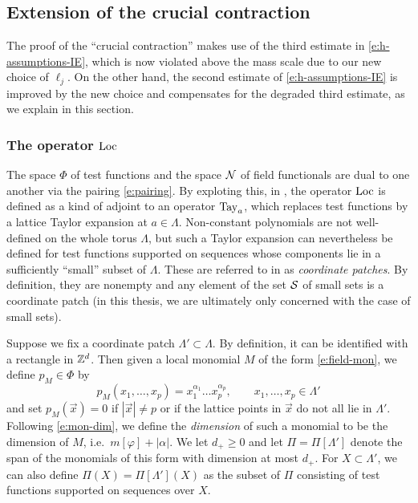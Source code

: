 
\subsection{Extension of the crucial contraction}
\label{sec:cc}

The proof of the ``crucial contraction''
\cite[Proposition \ref{IE-prop:cl}]{BS-rg-IE}
makes use of the  third estimate in
\eqref{e:h-assumptions-IE}, which is now violated above the mass scale
due to our new choice of $\ell_j$.
On the other hand, the second estimate of \eqref{e:h-assumptions-IE} is
improved by the new choice and compensates for the degraded third estimate,
as we explain in this section.

\subsubsection{The operator $\operatorname{Loc}$}

The space $\Phi$ of test functions and the space $\mathcal{N}$ of field functionals
are dual to one another via the pairing \eqref{e:pairing}. By exploting this,
in \cite{BS-rg-IE}, the operator $\operatorname{Loc}$ is defined as a kind of adjoint to
an operator ${\rm Tay}_a$, which replaces test functions by a lattice Taylor expansion
at $a\in\Lambda$.
Non-constant polynomials are not well-defined on the whole torus $\Lambda$, but
such a Taylor expansion can nevertheless be defined for test functions supported
on sequences whose components lie in a sufficiently ``small'' subset of $\Lambda$.
These are referred to in \cite{BS-rg-IE} as \emph{coordinate patches}. By definition,
they are nonempty and any element of the set $\mathcal{S}$ of small sets is a coordinate
patch (in this thesis, we are ultimately only concerned with the case of small sets).

Suppose we fix a coordinate patch $\Lambda' \subset \Lambda$. By definition, it
can be identified with a rectangle in ${ {{\mathbb Z}}^d }$.
Then given a local monomial $M$ of the form \eqref{e:field-mon},
we define $p_M\in\Phi$ by
\begin{equation}
\label{e:lattice-mon}
p_M(x_1, \ldots, x_p)
	=
x_1^{\alpha_1} \ldots x_p^{\alpha_p},
	\qquad
x_1, \ldots, x_p \in \Lambda'
\end{equation}
and set $p_M(\vec x) = 0$ if $|\vec x| \ne p$ or if the lattice points in $\vec x$
do not all lie in $\Lambda'$. Following \eqref{e:mon-dim},
we define the \emph{dimension} of such a monomial to be the dimension of $M$,
i.e.\ $m [\varphi] + |\alpha|$.
We let $d_+ \ge 0$ and let $\Pi = \Pi[\Lambda']$ denote the span of the monomials
of this form with dimension at most $d_+$. For $X \subset \Lambda'$, we can also define
$\Pi(X) = \Pi[\Lambda'](X)$ as the subset of $\Pi$ consisting of test functions
supported on sequences over $X$.

